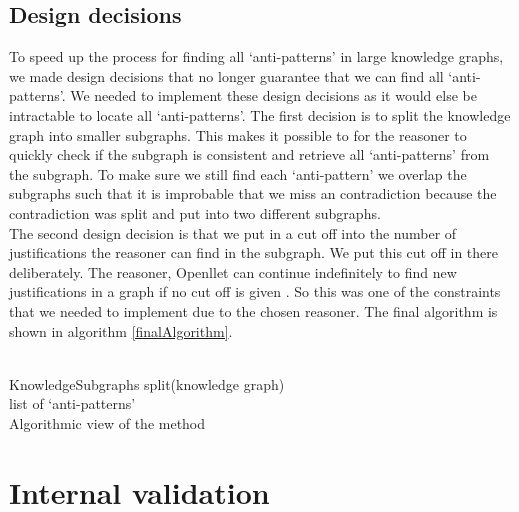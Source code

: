 \documentclass[11pt,letterpaper ,oneside ]{book}
\begin{document}
	\section{Design decisions}
	To speed up the process for finding all `anti-patterns' in large knowledge graphs, we made design decisions that no longer guarantee that we can find all `anti-patterns'. We needed to implement these design decisions as it would else be intractable to locate all `anti-patterns'. 
	The first decision is to split the knowledge graph into smaller subgraphs. This makes it possible to for the reasoner to quickly check if the subgraph is consistent and retrieve all `anti-patterns' from the subgraph. To make sure we still find each `anti-pattern' we overlap the subgraphs such that it is improbable that we miss an contradiction because the contradiction was split and put into two different subgraphs.\\
	The second design decision is that we put in a cut off into the number of justifications the reasoner can find in the subgraph. We put this cut off in there deliberately. The reasoner, Openllet can continue indefinitely to find new justifications in a graph if no cut off is given \cite{Openllet:2019}. So this was one of the constraints that we needed to implement due to the chosen reasoner. 
	The final algorithm is shown in algorithm \ref{finalAlgorithm}.\\
	\\
	\begin{algorithm}
		KnowledgeSubgraphs split(knowledge graph)\\
		
		\Return list of `anti-patterns'\\
		\caption{Algorithmic view of the method}
		\label{finalAlgorithm}
	\end{algorithm}
	
	\newpage
	
	\chapter{Internal validation}\label{Experiments}
	
\end{document}
